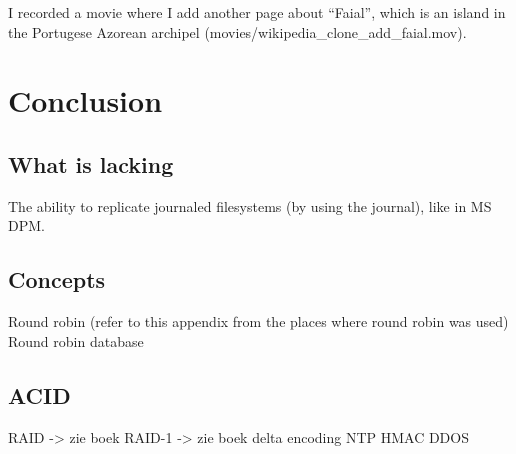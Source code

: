\documentclass[12pt]{report}
\begin{document}
I recorded a movie where I add another page about ``Faial'', which is
an island in the Portugese Azorean archipel (movies/wikipedia\_clone\_add\_faial.mov).

\chapter{Conclusion} %
\section{What is lacking}
The ability to replicate journaled filesystems (by using the journal),
like in MS DPM.

\begin{appendices}
\chapter{Concepts}
Round robin (refer to this appendix from the places where round robin
was used)
Round robin database
\section{ACID}
\label{appendix_acid}
RAID
-> zie boek
RAID-1
-> zie boek
delta encoding
NTP
HMAC
DDOS
\label{ddos}
\end{appendices}




{}


\end{document}
